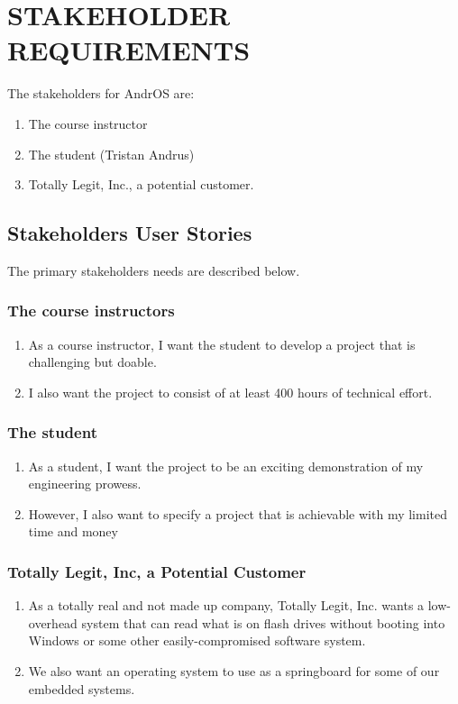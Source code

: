 \section{STAKEHOLDER REQUIREMENTS} %
The stakeholders for AndrOS are:

\begin{enumerate}
	\item The course instructor
  \item The student (Tristan Andrus)
  \item Totally Legit, Inc., a potential customer.
\end{enumerate}


\subsection{Stakeholders User Stories}
The primary stakeholders needs are described below.

%

\subsubsection{The course instructors}
\begin{enumerate}
  \item As a course instructor, I want the student to develop a project that is challenging but doable. 
  \item I also want the project to consist of at least 400 hours of technical effort.
\end{enumerate}



\subsubsection{The student}
\begin{enumerate}
  \item As a student, I want the project to be an exciting demonstration of my engineering prowess.
  \item However, I also want to specify a project that is achievable with my limited time and money
\end{enumerate}


\subsubsection{Totally Legit, Inc, a Potential Customer}
\begin{enumerate}
  \item As a totally real and not made up company, Totally Legit, Inc. wants a low-overhead system that can read what is on flash drives without booting into Windows or some other easily-compromised software system.
  \item We also want an operating system to use as a springboard for some of our embedded systems.
\end{enumerate}
